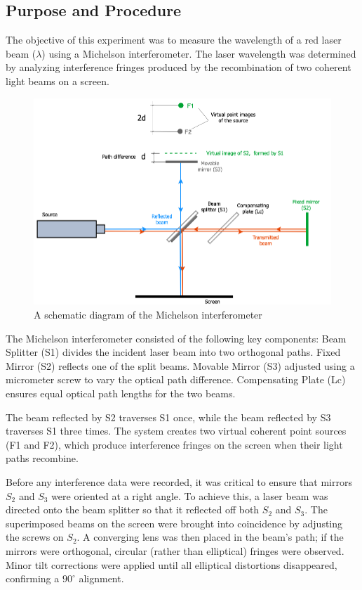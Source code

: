 \subsection{Purpose and Procedure}


The objective of this experiment was to measure the wavelength of a red laser beam (\(\lambda\)) using a Michelson interferometer. The laser wavelength was determined by analyzing interference fringes produced by the recombination of two coherent light beams on a screen.  

\begin{figure}[h]
    \centering
    \includegraphics[width=0.9\linewidth]{The_Michelson_interferometer/finalimageupd3.png}
    \caption{A schematic diagram of the Michelson interferometer}
    \label{fig:michelson}
\end{figure}

The Michelson interferometer consisted of the following key components: Beam Splitter (S1) divides the incident laser beam into two orthogonal paths. Fixed Mirror (S2) reflects one of the split beams. Movable Mirror (S3) adjusted using a micrometer screw to vary the optical path difference. Compensating Plate (Lc) ensures equal optical path lengths for the two beams.  

The beam reflected by S2 traverses S1 once, while the beam reflected by S3 traverses S1 three times. The system creates two virtual coherent point sources (F1 and F2), which produce interference fringes on the screen when their light paths recombine.  

Before any interference data were recorded, it was critical to ensure that mirrors \(S_2\) and \(S_3\) were oriented at a right angle. To achieve this, a laser beam was directed onto the beam splitter so that it reflected off both \(S_2\) and \(S_3\). The superimposed beams on the screen were brought into coincidence by adjusting the screws on \(S_2\). A converging lens was then placed in the beam’s path; if the mirrors were orthogonal, circular (rather than elliptical) fringes were observed. Minor tilt corrections were applied until all elliptical distortions disappeared, confirming a \(90^\circ\) alignment. 

